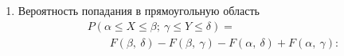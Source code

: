 \documentclass[a4paper]{article}
\makeatletter
\newcommand{\sleq}{\leqslant}
\renewcommand{\qedsymbol}{\ensuremath{\blacksquare}}
\newcommand{\qeddnostar}{\hfill{\color{Dark}\qedsymbol}}
\newcommand{\qeddstar}[1]{\hfill{\color{Dark}\raisebox{#1}{\qedsymbol}}}
\newcommand\qedd{\@ifstar\qeddstar\qeddnostar}
\makeatother
\begin{document}
\begin{enumerate}
                        Событие $(X_i < +\infty)$ является достоверным событием. Тогда
                        \begin{equation*}
                            \begin{aligned}
                                & P \big( (X_1 < x_1) \cap \ldots \cap (X_i < +\infty) \cap
                                \ldots \cap (X_n < x_n) \big) = \\[1.0ex]
                                & \qquad P \big( (X_1 < x_1) \cap \ldots \cap (X_n < x_n)
                                    \big) = \\[1.0ex]
                                & \qquad F(x_1 , \: \ldots , \: x_{i - 1} , \: x_{i + 1} , \:
                                    \ldots , \: x_n) .
                            \end{aligned} \qedd*{-4.3ex}
                        \end{equation*}

                        \item Вероятность попадания в прямоугольную область
                        \begin{equation*}
                            \begin{aligned}
                                & P(\alpha \sleq X \sleq \beta ; \:
                                    \gamma \sleq Y \sleq \delta) = \\[1.0ex]
                                & \qquad F(\beta , \: \delta) - F(\beta , \: \gamma) - 
                                    F(\alpha , \: \delta) + F(\alpha , \: \gamma) :
                            \end{aligned}
                        \end{equation*}


\end{enumerate}
\end{document}
